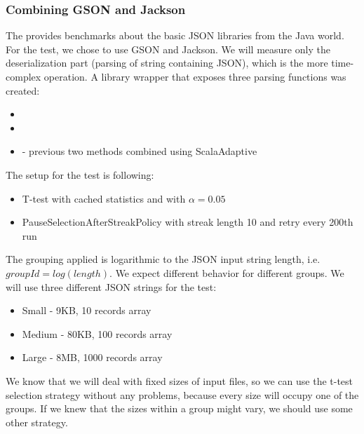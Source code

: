 \subsubsection{Combining GSON and Jackson}

The \cite{dreyfuss_ultimate_2015} provides benchmarks about the basic JSON libraries from the Java world. For the test, we chose to use GSON and Jackson. We will measure only the deserialization part (parsing of string containing JSON), which is the more time-complex operation. A library wrapper that exposes three parsing functions was created:
\begin{itemize}
	\item {}
	\item {}
	\item {} - previous two methods combined using ScalaAdaptive
\end{itemize}

The setup for the test is following:
\begin{itemize}
	\item T-test with cached statistics and with $\alpha = 0.05$
	\item PauseSelectionAfterStreakPolicy with streak length 10 and retry every 200th run
\end{itemize}

The grouping applied is logarithmic to the JSON input string length, i.e. $groupId = log(length)$. We expect different behavior for different groups. We will use three different JSON strings for the test:

\begin{itemize}
	\item Small - 9KB, 10 records array
	\item Medium - 80KB, 100 records array
	\item Large - 8MB, 1000 records array
\end{itemize}

We know that we will deal with fixed sizes of input files, so we can use the t-test selection strategy without any problems, because every size will occupy one of the groups. If we knew that the sizes within a group might vary, we should use some other strategy.


